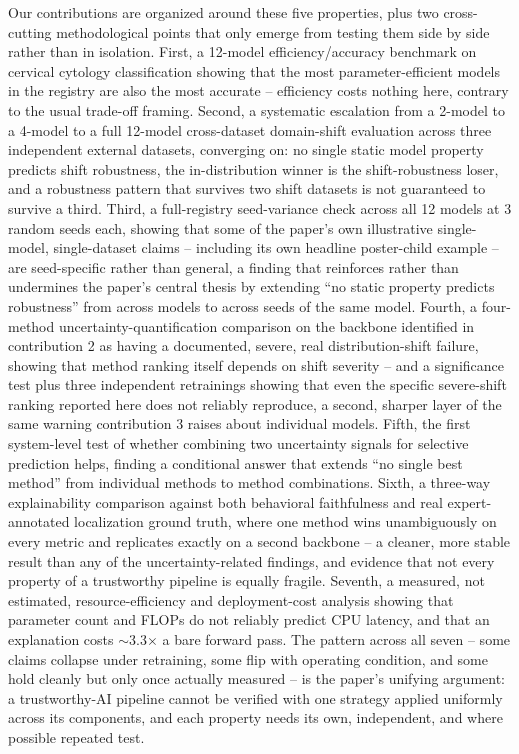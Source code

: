 \documentclass[runningheads]{llncs}
\begin{document}
Our contributions are organized around these five properties, plus two
cross-cutting methodological points that only emerge from testing them
side by side rather than in isolation. First, a 12-model efficiency/accuracy
benchmark on cervical cytology classification showing that the most
parameter-efficient models in the registry are also the most accurate --
efficiency costs nothing here, contrary to the usual trade-off framing.
Second, a systematic escalation from a 2-model to a 4-model to a full
12-model cross-dataset domain-shift evaluation across three independent
external datasets, converging on: no single static model property
predicts shift robustness, the in-distribution winner is the
shift-robustness loser, and a robustness pattern that survives two shift
datasets is not guaranteed to survive a third. Third, a full-registry
seed-variance check across all 12 models at 3 random seeds each, showing
that some of the paper's own illustrative single-model, single-dataset
claims -- including its own headline poster-child example -- are
seed-specific rather than general, a finding that reinforces rather than
undermines the paper's central thesis by extending ``no static property
predicts robustness'' from across models to across seeds of the same
model. Fourth, a four-method uncertainty-quantification comparison on the
backbone identified in contribution 2 as having a documented, severe, real
distribution-shift failure, showing that method ranking itself depends on
shift severity -- and a significance test plus three independent
retrainings showing that even the specific severe-shift ranking reported
here does not reliably reproduce, a second, sharper layer of the same
warning contribution 3 raises about individual models. Fifth, the first
system-level test of whether combining two uncertainty signals for
selective prediction helps, finding a conditional answer that extends
``no single best method'' from individual methods to method combinations.
Sixth, a three-way explainability comparison against both behavioral
faithfulness and real expert-annotated localization ground truth, where
one method wins unambiguously on every metric and replicates exactly on a
second backbone -- a cleaner, more stable result than any of the
uncertainty-related findings, and evidence that not every property of a
trustworthy pipeline is equally fragile. Seventh, a measured, not
estimated, resource-efficiency and deployment-cost analysis showing that
parameter count and FLOPs do not reliably predict CPU latency, and that an
explanation costs $\sim$3.3$\times$ a bare forward pass. The pattern
across all seven -- some claims collapse under retraining, some flip with
operating condition, and some hold cleanly but only once actually
measured -- is the paper's unifying argument: a trustworthy-AI pipeline
cannot be verified with one strategy applied uniformly across its
components, and each property needs its own, independent, and where
possible repeated test.
\end{document}
